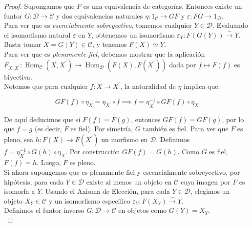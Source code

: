 \documentclass{article}
\theoremstyle{plain}
\theoremstyle{definition}
\theoremstyle{remark}
\begin{document}
\begin{proof}
    Supongamos que $F$ es una equivalencia de categorías. Entonces existe un funtor $G: \mathcal{D} \to \mathcal{C}$ y dos equivalencias naturales $\eta: 1_{\mathcal{C}} \to GF$ y $\varepsilon: FG \to 1_{\mathcal{D}}$.\\
    
    Para ver que es \textit{esencialmente sobreyectivo}, tomemos cualquier $Y \in \mathcal{D}$. Evaluando el isomorfismo natural $\varepsilon$ en $Y$, obtenemos un isomorfismo $\varepsilon_Y: F(G(Y)) \xrightarrow{\sim} Y$. Basta tomar $X = G(Y) \in \mathcal{C}$, y tenemos $F(X) \simeq Y$.\\
    
    Para ver que es \textit{plenamente fiel}, debemos mostrar que la aplicación $F_{X,X^\prime}: \operatorname{Hom}_{\mathcal{C}}(X, X^\prime) \to \operatorname{Hom}_{\mathcal{D}}(F(X), F(X^\prime))$ dada por $f \mapsto F(f)$ es biyectiva.  \\

    Notemos que para cualquier $f: X \to X^\prime$, la naturalidad de $\eta$ implica que:

    \begin{equation*}
        GF(f) \circ \eta_X = \eta_{X^\prime} \circ f \implies f = \eta_{X^\prime}^{-1} \circ GF(f) \circ \eta_X
    \end{equation*}

    De aquí deducimos que si $F(f) = F(g)$, entonces $GF(f) = GF(g)$, por lo que $f = g$ (es decir, $F$ es fiel). Por simetría, $G$ también es fiel. Para ver que $F$ es pleno, sea $h: F(X) \to F(X^\prime)$ un morfismo en $\mathcal{D}$. Definimos $f = \eta_{X^\prime}^{-1} \circ G(h) \circ \eta_X$. Por construcción $GF(f) = G(h)$. Como $G$ es fiel, $F(f) = h$. Luego, $F$ es pleno.\\


    Si ahora supongemos que es plenamente fiel y escencialmente sobreyectivo, por hipótesis, para cada $Y \in \mathcal{D}$ existe al menos un objeto en $\mathcal{C}$ cuya imagen por $F$ es isomorfa a $Y$. Usando el Axioma de Elección, para cada $Y \in \mathcal{D}$, elegimos un objeto $X_Y \in \mathcal{C}$ y un isomorfismo específico $\varepsilon_Y: F(X_Y) \xrightarrow{\sim} Y$.  \\
    
    Definimos el funtor inverso $G: \mathcal{D} \to \mathcal{C}$ en objetos como $G(Y) = X_Y$. \\


\end{proof}
\end{document}
